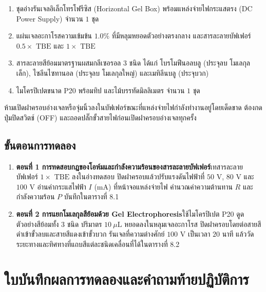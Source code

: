\begin{equipbox}
\begin{enumerate}
    \item ชุดอ่างรันเจลอิเล็กโทรโฟรีซิส (Horizontal Gel Box) พร้อมแหล่งจ่ายไฟกระแสตรง (DC Power Supply) จำนวน $1$ ชุด
    \item แผ่นเจลอะกาโรสความเข้มข้น $1.0\%$ ที่มีหลุมหยอดตัวอย่างตรงกลาง และสารละลายบัฟเฟอร์ $0.5\times\text{ TBE}$ และ $1\times\text{ TBE}$
    \item สารละลายสีย้อมมาตรฐานผสมกลีเซอรอล 3 ชนิด ได้แก่ โบรโมฟีนอลบลู (ประจุลบ โมเลกุลเล็ก), ไซลีนไซทานอล (ประจุลบ โมเลกุลใหญ่) และเมทิลีนบลู (ประจุบวก)
    \item ไมโครปิเปตขนาด P20 พร้อมทิป และไม้บรรทัดมิลลิเมตร จำนวน $1$ ชุด
\end{enumerate}
\end{equipbox}

\begin{warningbox}
ห้ามเปิดฝาครอบอ่างเจลหรือจุ่มนิ้วลงในบัฟเฟอร์ขณะที่แหล่งจ่ายไฟกำลังทำงานอยู่โดยเด็ดขาด ต้องกดปุ่มปิดสวิตช์ (OFF) และถอดปลั๊กขั้วสายไฟก่อนเปิดฝาครอบอ่างเจลทุกครั้ง
\end{warningbox}

\subsection{ขั้นตอนการทดลอง}
\begin{enumerate}
    \item \textbf{ตอนที่ 1 การทดสอบกฎของโอห์มและกำลังความร้อนของสารละลายบัฟเฟอร์}\quad เทสารละลายบัฟเฟอร์ $1\times\text{ TBE}$ ลงในอ่างทดสอบ ปิดฝาครอบแล้วปรับแรงดันไฟฟ้าที่ $50\text{ V}$, $80\text{ V}$ และ $100\text{ V}$ อ่านค่ากระแสไฟฟ้า $I$ ($\text{mA}$) ที่หน้าจอแหล่งจ่ายไฟ คำนวณค่าความต้านทาน $R$ และกำลังความร้อน $P$ บันทึกใน\mbox{ตารางที่} 8.1
    \item \textbf{ตอนที่ 2 การแยกโมเลกุลสีย้อมด้วย Gel Electrophoresis}\quad ใช้ไมโครปิเปต P20 ดูดตัวอย่างสีย้อมทั้ง 3 ชนิด ปริมาตร $10\ \mu\text{L}$ หยอดลงในหลุมเจลอะกาโรส ปิดฝาครอบโดยต่อสายสีดำเข้าขั้วลบและสายสีแดงเข้าขั้วบวก รันเจลที่ความต่างศักย์ $100\text{ V}$ เป็นเวลา $20$ นาที แล้ววัดระยะทางและทิศทางที่แถบสีแต่ละชนิดเคลื่อนที่ได้ใน\mbox{ตารางที่} 8.2
\end{enumerate}

\section{ใบบันทึกผลการทดลองและคำถามท้ายปฏิบัติการ}

